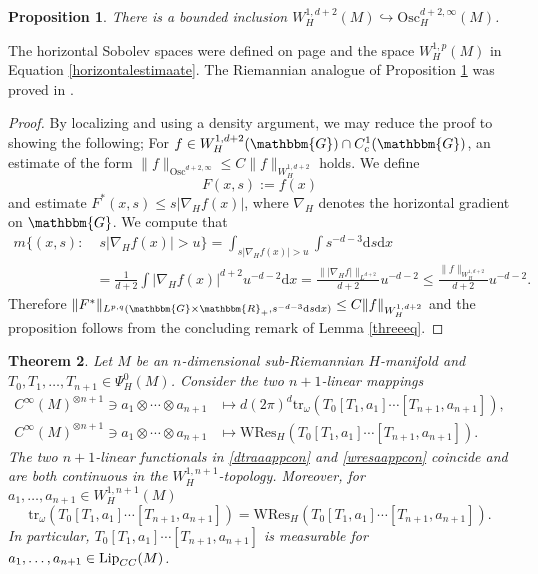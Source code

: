 \documentclass[10pt]{amsart}
\newtheorem{thm}{Theorem}[section]
\newtheorem{prop}[thm]{Proposition}
\theoremstyle{remark}
\theoremstyle{definition}
\begin{document}
\begin{prop}
\label{dinftyprop}
There is a bounded inclusion $W^{1,d+2}_H(M)\hookrightarrow \mathrm{Osc}^{d+2,\infty}_H(M)$.
\end{prop}

The horizontal Sobolev spaces were defined on page \pageref{horizontalestimaate} and the space $W^{1,p}_H(M)$ in Equation \eqref{horizontalestimaate}. The Riemannian analogue of Proposition \ref{dinftyprop} was proved in \cite[page 228]{otherrochbergsemmes}. 

\begin{proof}
By localizing and using a density argument, we may reduce the proof to showing the following; For $f\in W^{1,d+2}_H(\mathbbm{G})\cap C^1_c(\mathbbm{G})$, an estimate of the form $\|f\|_{\mathrm{Osc}^{d+2,\infty}}\leq C\|f\|_{W^{1,d+2}_H}$ holds. We define 
$$F(x,s):=f(x)$$ 
and estimate $F^*(x,s)\leq s|\nabla_Hf(x)|$, where $\nabla_H$ denotes the horizontal gradient on $\mathbbm{G}$. We compute that
\begin{align*}
m\{(x,s): &\;s|\nabla_Hf(x)|>u\}=\int_{s|\nabla_Hf(x)|>u}\int s^{-d-3}{\mathrm{d}} s{\mathrm{d}} x\\
&=\frac{1}{d+2}\int |\nabla_Hf(x)|^{d+2} u^{-d-2}{\mathrm{d}} x=\frac{\||\nabla_Hf|\|_{L^{d+2}}}{d+2}u^{-d-2}\leq \frac{\|f\|_{W^{1,d+2}_H}}{d+2}u^{-d-2}.
\end{align*}
Therefore $\|F^*\|_{L^{p,q}(\mathbbm{G}\times {\mathbbm{R}}_+, s^{-d-3}{\mathrm{d}} s{\mathrm{d}} x)}\leq C\|f\|_{W^{1,d+2}_H}$ and the proposition follows from the concluding remark of Lemma \ref{threeeq}.
\end{proof}

\begin{thm}
\label{extedi}
Let $M$ be an $n$-dimensional sub-Riemannian $H$-manifold and $T_0,T_1,\ldots, T_{n+1}\in \Psi^0_H(M)$. Consider the two $n+1$-linear mappings 
\begin{align}
\label{dtraaappcon}
C^\infty(M)^{\otimes n+1}\ni a_1\otimes \cdots \otimes a_{n+1}&\mapsto d(2\pi)^d{\mathrm{t}\mathrm{r}}_\omega(T_0[T_1,a_1]\cdots [T_{n+1},a_{n+1}]),\\
\label{wresaappcon}
C^\infty(M)^{\otimes n+1}\ni a_1\otimes \cdots \otimes a_{n+1}&\mapsto \mathrm{WRes}_H(T_0[T_1,a_1]\cdots [T_{n+1},a_{n+1}]).
\end{align}
The two $n+1$-linear functionals in \eqref{dtraaappcon} and \eqref{wresaappcon} coincide and are both continuous in the $W^{1,n+1}_H$-topology. Moreover, for $a_1,\ldots, a_{n+1}\in W^{1,n+1}_H(M)$
$${\mathrm{t}\mathrm{r}}_\omega(T_0[T_1,a_1]\cdots [T_{n+1},a_{n+1}])= \mathrm{WRes}_H(T_0[T_1,a_1]\cdots [T_{n+1},a_{n+1}]).$$
In particular, $T_0[T_1,a_1]\cdots [T_{n+1},a_{n+1}]$ is measurable for $a_1,\ldots, a_{n+1}\in {\textnormal{Lip}}_{CC}(M)$.
\end{thm}
\end{document}
